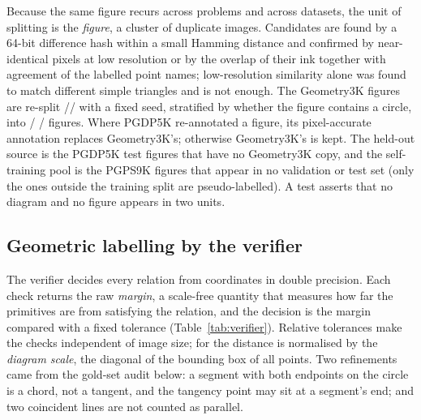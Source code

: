Because the same figure recurs across problems and across datasets, the unit of splitting is the \emph{figure}, a cluster of duplicate images. Candidates are found by a 64-bit difference hash within a small Hamming distance and confirmed by near-identical pixels at low resolution or by the overlap of their ink together with agreement of the labelled point names; low-resolution similarity alone was found to match different simple triangles and is not enough. The \nGeometryFigures{} Geometry3K figures are re-split \splitPctTrain/\splitPctVal/\splitPctTest{} with a fixed seed, stratified by whether the figure contains a circle, into \nFiguresTrain{} / \nFiguresVal{} / \nFiguresTest{} figures. Where PGDP5K re-annotated a figure, its pixel-accurate annotation replaces Geometry3K's; otherwise Geometry3K's is kept. The held-out source is the \nHeldoutFigures{} PGDP5K test figures that have no Geometry3K copy, and the self-training pool is the \nPoolFigures{} PGPS9K figures that appear in no validation or test set (only the ones outside the training split are pseudo-labelled). A test asserts that no diagram and no figure appears in two units.

\subsection{Geometric labelling by the verifier}
\label{sec:verifier}

The verifier decides every relation from coordinates in double precision. Each check returns the raw \emph{margin}, a scale-free quantity that measures how far the primitives are from satisfying the relation, and the decision is the margin compared with a fixed tolerance (Table~\ref{tab:verifier}). Relative tolerances make the checks independent of image size; for  the distance is normalised by the \emph{diagram scale}, the diagonal of the bounding box of all points. Two refinements came from the gold-set audit below: a segment with both endpoints on the circle is a chord, not a tangent, and the tangency point may sit at a segment's end; and two coincident lines are not counted as parallel.

